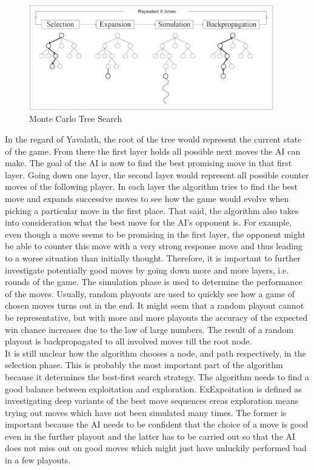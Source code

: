 \documentclass[english]{report}
\begin{document}
\begin{figure}[ht]
\centering
\includegraphics[width=0.95\textwidth]{Abbildungen/MonteCarloTreeSearch.png}
\caption[Monte Carlo Tree Search, Source:\cite{paper:mcts}]{Monte Carlo Tree Search}
\label{fig:mcts}
\end{figure}

In the regard of Yavalath, the root of the tree would represent the current
state of the game. From there the first layer holds all possible next moves the
AI can make. The goal of the AI is now to find the best promising move in that
first layer. Going down one layer, the second layer would represent all possible
counter moves of the following player. In each layer the algorithm tries to find
the best move and expands successive moves to see how the game would evolve when
picking a particular move in the first place. That said, the algorithm also
takes into consideration what the best move for the AI's opponent is. For example,
even though a move seems to be promising in the first layer, the opponent might
be able to counter this move with a very strong response move and thus leading
to a worse situation than initially thought. Therefore, it is important to
further investigate potentially good moves by going down more and more layers,
i.e. rounds of the game. The simulation phase is used to determine the
performance of the moves. Usually, random playouts are used to quickly see how a
game of chosen moves turns out in the end. It might seem that a random playout
cannot be representative, but with more and more playouts the accuracy of the
expected win chance increases due to the law of large numbers.
The result of a random playout is backpropagated to all involved moves till the
root node.\\

It is still unclear how the algorithm chooses a node, and path
respectively, in the selection phase. This is probably the most important part
of the algorithm because it determines the best-first search strategy. The
algorithm needs to find a good balance between exploitation and exploration.
ExExpoitation is defined as investigating deep variants of the best move sequences
ereas exploration means trying out moves which have not been simulated many
times. The former is important because the AI needs to be confident that the
choice of a move is good even in the further playout and the latter has to be
carried out so that the AI does not miss out on good moves which might just have
unluckily performed bad in a few playouts.\\
\end{document}
